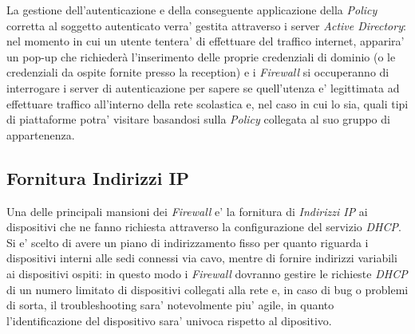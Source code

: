 \documentclass{report}
\begin{document}
             La gestione dell’autenticazione e della conseguente applicazione della \emph{Policy} corretta al soggetto
             autenticato verra' gestita attraverso i server \emph{Active Directory}: nel momento in cui un utente tentera'
             di effettuare del traffico internet, apparira' un pop-up che richiederà l’inserimento delle proprie
             credenziali di dominio (o le credenziali da ospite fornite presso la reception) e i \emph{Firewall}
             si occuperanno di interrogare i server di autenticazione per sapere se quell’utenza e' legittimata
             ad effettuare traffico all’interno della rete scolastica e, nel caso in cui lo sia, quali tipi di
             piattaforme potra' visitare basandosi sulla \emph{Policy} collegata al suo gruppo di
             appartenenza.
        \subsection{Fornitura Indirizzi IP}
            Una delle principali mansioni dei \emph{Firewall} e' la fornitura di \emph{Indirizzi IP} ai dispositivi che ne
             fanno richiesta attraverso la configurazione del servizio \emph{DHCP}. Si e' scelto di avere un piano di
             indirizzamento fisso per quanto riguarda i dispositivi interni alle sedi connessi via cavo, mentre di
             fornire indirizzi variabili ai dispositivi ospiti: in questo modo i \emph{Firewall} dovranno gestire le
             richieste \emph{DHCP} di un numero limitato di dispositivi collegati alla rete e, in caso di bug o
             problemi di sorta, il troubleshooting sara' notevolmente piu' agile, in quanto l'identificazione
             del dispositivo sara' univoca rispetto al dipositivo.
\end{document}
